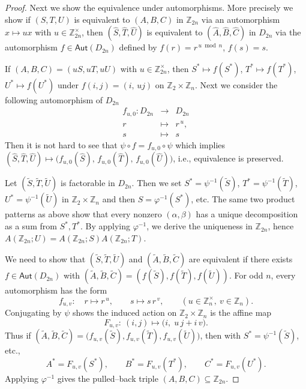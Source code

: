 \documentclass[10pt,a4paper]{amsart}
\newcommand{\Aut}{\mathsf{Aut}}
\newcommand{\Z}{\mathbb{Z}}
\begin{document}
\begin{proof}
Next we show the equivalence under automorphisms.
More precisely we show
if $(S,T,U)$ is equivalent to $(A,B,C)$ in $\Z_{2n}$ via an automorphism
$x\mapsto ux$ with $u\in\Z_{2n}^\times$, then 
$(\widehat S,\widehat T,\widehat U)$ is equivalent to $(\widehat A,\widehat B,\widehat C)$
in $D_{2n}$ via the automorphism $f\in\Aut(D_{2n})$ defined by $f(r)=r^{\,u\bmod n}$, $f(s)=s$.

If $(A,B,C)=(uS,uT,uU)$ with $u\in\Z_{2n}^\times$, then
$S^*\mapsto f(S^*)$, $T^*\mapsto f(T^*)$, $U^*\mapsto f(U^*)$ under
$f(i,j)=(i,\,u j)$ on $\Z_2\times\Z_n$. 
Next we consider the following automorphism of $D_{2n}$
\[
\begin{array}{rcl}
f_{u,0} \colon D_{2n} &\longrightarrow& D_{2n} \\[4pt]
r &\longmapsto& r^{\,u}, \\[2pt]
s &\longmapsto& s
\end{array}
\]
Then it is not hard to see that 
$\psi\circ f=f_{u,0}\circ \psi$
 which implies $(\widehat S,\widehat T,\widehat U)\mapsto
\bigl(f_{u,0}(\widehat S),\,f_{u,0}(\widehat T),\,f_{u,0}(\widehat U)\bigr)$,
i.e., equivalence is preserved. 

Let $(\widetilde S,\widetilde T,\widetilde U)$ is factorable in $D_{2n}$.
Then we set
$S^*=\psi^{-1}(\widetilde S)$, $T^*=\psi^{-1}(\widetilde T)$, $U^*=\psi^{-1}(\widetilde U)$
in $\Z_2\times\Z_n$ and then $S=\varphi^{-1}(S^*)$, etc.
The same two product patterns as above show that every nonzero $(\alpha,\beta)$
has a unique decomposition as a sum from $S^*,T^*$.
By applying $\varphi^{-1}$, we derive the uniqueness in $\Z_{2n}$, hence $A(\Z_{2n};U)=A(\Z_{2n};S)A(\Z_{2n};T)$.

We need to show that
$(\widetilde S,\widetilde T,\widetilde U)$ and $(\widetilde A,\widetilde B,\widetilde C)$
are equivalent if there exists $f\in\Aut(D_{2n})$ with
$(\widetilde A,\widetilde B,\widetilde C)=(f(\widetilde S),f(\widetilde T),f(\widetilde U))$.
For odd $n$, every automorphism has the form
\[
f_{u,v}:\quad r\mapsto r^{\,u},\qquad s\mapsto s\,r^{\,v},
\qquad (u\in\Z_n^{\times},\ v\in\Z_n).
\]
Conjugating by $\psi$ shows the induced action on $\Z_2\times\Z_n$ is the affine map
\[
F_{u,v}:\ (i,j)\longmapsto\bigl(i,\;u\,j+i\,v\bigr).
\]
Thus if $(\widetilde A,\widetilde B,\widetilde C)=\bigl(f_{u,v}(\widetilde S),f_{u,v}(\widetilde T),
f_{u,v}(\widetilde U)\bigr)$, then with $S^*=\psi^{-1}(\widetilde S)$, etc.,
\[
A^*=F_{u,v}(S^*),\qquad B^*=F_{u,v}(T^*),\qquad C^*=F_{u,v}(U^*).
\]
Applying $\varphi^{-1}$ gives the pulled–back triple $(A,B,C)\subseteq\Z_{2n}$.



\end{proof}
\end{document}
